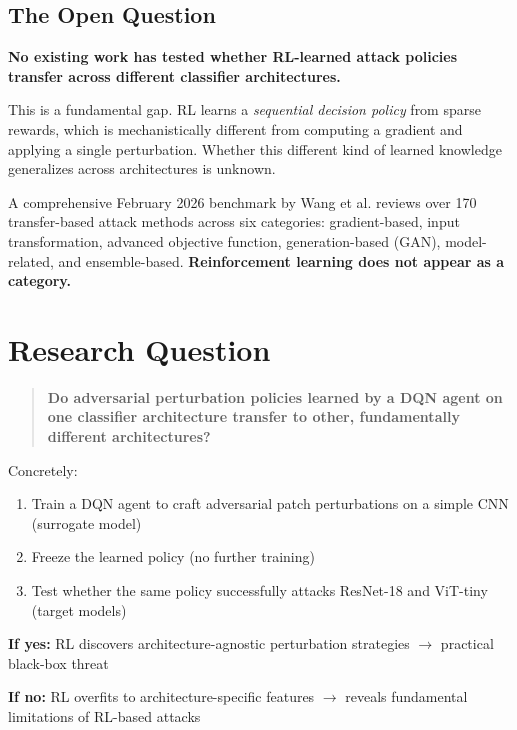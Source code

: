 \documentclass[11pt,a4paper]{article}
\begin{document}
\subsection{The Open Question}

\textbf{No existing work has tested whether RL-learned attack policies transfer across different classifier architectures.}

This is a fundamental gap. RL learns a \textit{sequential decision policy} from sparse rewards, which is mechanistically different from computing a gradient and applying a single perturbation. Whether this different kind of learned knowledge generalizes across architectures is unknown.

A comprehensive February 2026 benchmark by Wang et al. reviews over 170 transfer-based attack methods across six categories: gradient-based, input transformation, advanced objective function, generation-based (GAN), model-related, and ensemble-based. \textbf{Reinforcement learning does not appear as a category.}

\section{Research Question}

\begin{quote}
\textbf{Do adversarial perturbation policies learned by a DQN agent on one classifier architecture transfer to other, fundamentally different architectures?}
\end{quote}

Concretely:
\begin{enumerate}
    \item Train a DQN agent to craft adversarial patch perturbations on a simple CNN (surrogate model)
    \item Freeze the learned policy (no further training)
    \item Test whether the same policy successfully attacks ResNet-18 and ViT-tiny (target models)
\end{enumerate}

\textbf{If yes:} RL discovers architecture-agnostic perturbation strategies $\rightarrow$ practical black-box threat

\textbf{If no:} RL overfits to architecture-specific features $\rightarrow$ reveals fundamental limitations of RL-based attacks
\end{document}
